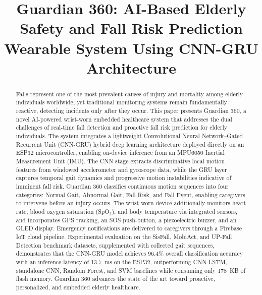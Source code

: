 \documentclass[conference]{IEEEtran}
\begin{document}
\title{Guardian 360: AI-Based Elderly Safety and Fall Risk Prediction Wearable System Using CNN-GRU Architecture}

\author{
}

\maketitle

\begin{abstract}
Falls represent one of the most prevalent causes of injury and mortality among elderly individuals worldwide, yet traditional monitoring systems remain fundamentally reactive, detecting incidents only after they occur. This paper presents Guardian 360, a novel AI-powered wrist-worn embedded healthcare system that addresses the dual challenges of real-time fall detection and proactive fall risk prediction for elderly individuals. The system integrates a lightweight Convolutional Neural Network--Gated Recurrent Unit (CNN-GRU) hybrid deep learning architecture deployed directly on an ESP32 microcontroller, enabling on-device inference from an MPU6050 Inertial Measurement Unit (IMU). The CNN stage extracts discriminative local motion features from windowed accelerometer and gyroscope data, while the GRU layer captures temporal gait dynamics and progressive motion instabilities indicative of imminent fall risk. Guardian 360 classifies continuous motion sequences into four categories: Normal Gait, Abnormal Gait, Fall Risk, and Fall Event, enabling caregivers to intervene before an injury occurs. The wrist-worn device additionally monitors heart rate, blood oxygen saturation (SpO$_2$), and body temperature via integrated sensors, and incorporates GPS tracking, an SOS push-button, a piezoelectric buzzer, and an OLED display. Emergency notifications are delivered to caregivers through a Firebase IoT cloud pipeline. Experimental evaluation on the SisFall, MobiAct, and UP-Fall Detection benchmark datasets, supplemented with collected gait sequences, demonstrates that the CNN-GRU model achieves 96.4\% overall classification accuracy with an inference latency of 13.7~ms on the ESP32, outperforming CNN-LSTM, standalone CNN, Random Forest, and SVM baselines while consuming only 178~KB of flash memory. Guardian 360 advances the state of the art toward proactive, personalized, and embedded elderly healthcare.
\end{abstract}
\end{document}
